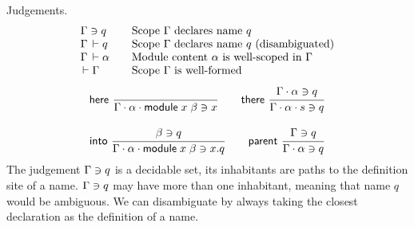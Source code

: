 \documentclass{article}
\theoremstyle{definition}
\theoremstyle{plain}
\theoremstyle{remark}
\begin{document}
Judgements.
\[
\begin{array}{l@{\qquad}l}
  \Contains \Gamma q & \mbox{Scope $\Gamma$ declares name $q$} \\
  \Declares \Gamma q & \mbox{Scope $\Gamma$ declares name $q$ (disambiguated)} \\
  \WContent \Gamma \alpha & \mbox{Module content $\alpha$ is well-scoped in $\Gamma$}\\
  \WScope \Gamma & \mbox{Scope $\Gamma$ is well-formed}
\end{array}
\]
\begin{gather*}
  \nru{\rhere
     }{
     }{\Contains {\Gamma \sep \alpha \sep \mdef x \beta} x}
\qquad
   \nru{\rthere
      }{\Contains {\Gamma \sep \alpha} q
      }{\Contains {\Gamma \sep \alpha \sep s} q}
\\[2ex]
  \nru{\rinto
     }{\Contains \beta q
     }{\Contains {\Gamma \sep \alpha \sep \mdef x \beta} {x.q}}
\qquad
   \nru{\rparent
      }{\Contains {\Gamma} q
      }{\Contains {\Gamma \sep \alpha} q}
\end{gather*}
The judgement $\Gamma\ni q$ is a decidable set, its inhabitants
are paths to the definition site of a name.
$\Gamma\ni q$ may have more than one inhabitant, meaning that
name $q$ would be ambiguous.
We can disambiguate by always taking the closest declaration as the
definition of a name.
\end{document}
